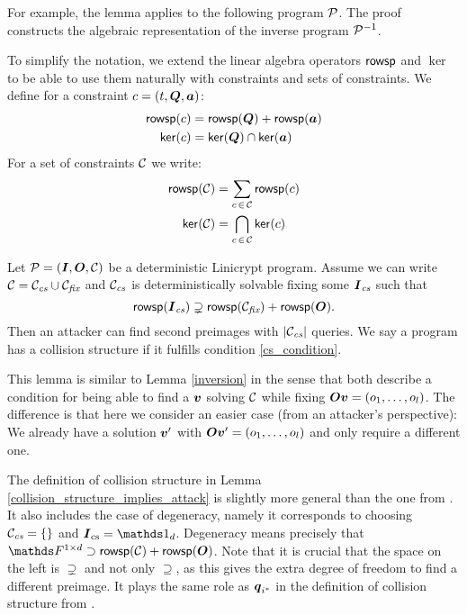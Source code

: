 For example, the lemma applies to the following program $\P$. 
The proof constructs the algebraic representation of the inverse program $\P^{-1}$.
\begin{pchstack}[center,space=2cm]
\end{pchstack}

To simplify the notation, we extend the linear algebra operators $\rowsp$ and $\ker$
to be able to use them naturally with constraints and sets of constraints.
We define for a constraint $c = (t, \Q, \va)$:
\begin{align*}
\rowsp(c) &= \rowsp(\Q) + \rowsp(\va) \\
\ker(c) &= \ker(\Q) \cap \ker(\va)
\end{align*}
For a set of constraints $\C$ we write:
\begin{align*}
\rowsp(\C) &= \sum_{c \, \in \, \C} \rowsp(c) \\
\ker(\C) &= \bigcap_{c \, \in \, \C} \ker(c)
\end{align*}

\begin{lemma}
\label{collision_structure_implies_attack}
    Let $\P = (\I, \O, \C)$ be a deterministic Linicrypt program.
    Assume we can write $\C = \Ccs \cup \Cfix$ and
    $\Ccs$ is deterministically solvable fixing some $\Ics$ such that
    \begin{equation}
    \label{cs_condition}
        \rowsp(\Ics) \supsetneq \rowsp(\Cfix) + \rowsp(\O).
    \end{equation}
    Then an attacker can find second preimages with $|\Ccs|$ queries.
    We say a program has a collision structure if it fulfills condition \eqref{cs_condition}.
\end{lemma}

This lemma is similar to Lemma \ref{inversion} in the sense that both describe a condition for being able to find a $\vv$ solving $\C$ while fixing $\O\vv = \vec o l$.
The difference is that here we consider an easier case (from an attacker's perspective):
We already have a solution $\vv'$ with $\O \vv' = \vec o l$ and only require a different one. 

The definition of collision structure in Lemma \ref{collision_structure_implies_attack}
is slightly more general than the one from \cite{TCC:McQSwoRos19}.
It also includes the case of degeneracy, 
namely it corresponds to choosing $\Ccs = \{\}$ and $\I_\textrm{cs} = \Id_\base$.
Degeneracy means precisely that $\F^{1\times\base} \supset \rowsp(\C) + \rowsp(\O)$.
Note that it is crucial that the space on the left is $\supsetneq$ and not only $\supseteq$,
as this gives the extra degree of freedom to find a different preimage.
It plays the same role as $\vq_{i^*}$ in the definition of collision structure from \cite{TCC:McQSwoRos19}.


